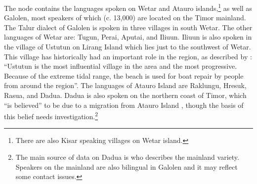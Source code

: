 The  node contains the languages spoken on
Wetar and Atauro islands,\footnote{
		There are also Kisar speaking villages
		on Wetar island.}
as well as Galolen,
most speakers of which (c.
13,000) are located on the Timor mainland.
The Talur dialect of Galolen is spoken in three villages in south Wetar.
The other languages of Wetar are: Tugun,
Perai, Aputai, and Ili{\Q}uun.
Ili{\Q}uun is also spoken in the village of Ustutun on Lirang
Island which lies just to the southwest of Wetar.
This village has historically had an important role in the region,
as described by \citet[114]{Hinton2000}: “Ustutun is the most
influential village in the area
and the most progressive.
Because of the extreme tidal range,
the beach is used for boat repair by people from around the region”.
The languages of Atauro Island are Raklungu,
Hresuk, Rasua, and Dadu{\Q}a.
Dadu{\Q}a is also spoken on the northern coast of Timor,
which “is believed” to be due to a migration from Atauro Island
\citep[4]{Penn2006}, though the basis of this belief needs investigation.\footnote{
		The main source of data on Dadu{\Q}a is \citet{Penn2006} who describes the mainland variety.
		Speakers on the mainland are also bilingual in Galolen
		and it may reflect some contact issues.}

